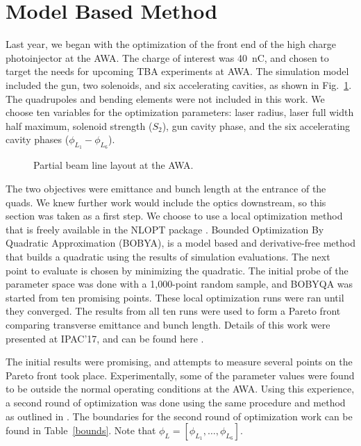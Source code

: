 \documentclass[letterpaper,  %
              ]{jacow-2_3}   %
\begin{document}
\section{Model Based Method}
Last year, we began with the optimization of the front end of 
the high charge photoinjector at the AWA. The charge
of interest was \SI{40}{nC}, and chosen to target the needs 
for upcoming TBA experiments at AWA.
The simulation model included the gun, two solenoids, 
and six accelerating cavities, as shown in Fig.~\ref{beamline}. 
The quadrupoles and bending elements were not included in this work.
We choose ten variables for the optimization parameters: 
laser radius, laser full width half maximum, solenoid strength ($S_2$), 
gun cavity phase, and the six accelerating cavity phases ($\phi_{L_1}-\phi_{L_6}$).
\begin{figure}
	\centering
	\begin{tikzpicture}[scale=0.7, text=black]
	
	\end{tikzpicture}	
	\caption{Partial beam line layout at the AWA.}
	\label{beamline}
\end{figure}

The two objectives were emittance and bunch length at the 
entrance of the quads. We knew further work would include the optics
downstream, so this section was taken as a first step. 
We choose to use a local optimization method that is 
freely available in the NLOPT package \cite{nlopt}. 
Bounded Optimization By Quadratic Approximation (BOBYA), 
is a model based and derivative-free method 
that builds a quadratic using the results of simulation evaluations. 
The next point to evaluate is chosen by minimizing the quadratic.
The initial probe of the parameter space was done with a 1,000-point random sample, 
and BOBYQA was started from ten promising points. 
These local optimization runs were ran until they converged.
The results from all ten runs were used to form a Pareto front
comparing transverse emittance and bunch length. 
Details of this work were presented at IPAC'17, and can be found here \cite{denmark}. 

The initial results were promising, and attempts to measure
several points on the Pareto front took place.
Experimentally, some of the parameter values were found to 
be outside the normal operating conditions at the AWA.
Using this experience, a second round of optimization 
was done using the same procedure and method as 
outlined in \cite{denmark}. The boundaries for the second
round of optimization work can be found in Table~\ref{bounds}.
Note that $\phi_L=[\phi_{L_1},\ldots,\phi_{L_6}]$.
\end{document}
